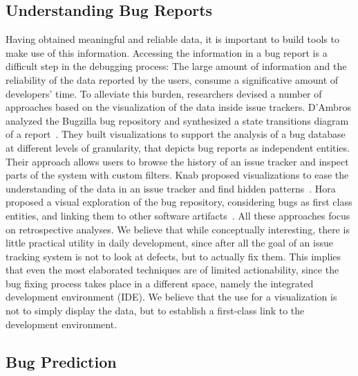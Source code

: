 


\subsection{Understanding Bug Reports}

Having obtained meaningful and reliable data, it is important to build tools to make use of this information.
Accessing the information in a bug report is a difficult step in the debugging process: The large amount of information and the reliability of the data reported by the users, consume a significative amount of developers' time.
To alleviate this burden, researchers devised a number of approaches based on the visualization of the data inside issue trackers.
D'Ambros \etal analyzed the Bugzilla bug repository and synthesized a state transitions diagram of a report~\cite{DAmb2007b}.
They built visualizations to support the analysis of a bug database at different levels of granularity, that depicts bug reports as independent entities.
Their approach allows users to browse the history of an issue tracker and inspect parts of the system with custom filters.
Knab \etal proposed visualizations to ease the understanding of the data in an issue tracker and find hidden patterns~\cite{Knab2009a,Knab2010a}.
Hora \etal proposed a visual exploration of the bug repository, considering bugs as first class entities, and linking them to other software artifacts~\cite{Hora2012a}.
All these approaches focus on retrospective analyses. We believe that while conceptually interesting, there is little practical utility in daily development, since after all the goal of an issue tracking system is not to look at defects, but to actually fix them.
This implies that even the most elaborated techniques are of limited actionability, since the bug fixing process takes place in a different space, namely the integrated development environment (IDE).
We believe that the use for a visualization is not to simply display the data, but to establish a first-class link to the development environment.


\subsection{Bug Prediction}

